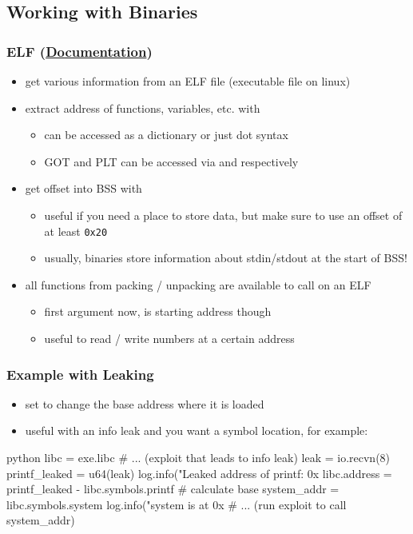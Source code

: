 \documentclass[aspectratio=169]{beamer}
\newcommand{\hex}[1]{\texttt{0x#1}}
\newcommand{\docl}[1]{(\textbf{\href{#1}{Documentation}})}
\begin{document}
{\subsection{Working with Binaries}
\begin{frame}[fragile]
    \frametitle{ELF \docl{http://docs.pwntools.com/en/stable/elf/elf.html\#module-pwnlib.elf.elf}}
    \begin{itemize}
        \item get various information from an ELF file (executable file on linux)
        \item extract address of functions, variables, etc. with 
        \begin{itemize}
            \item can be accessed as a dictionary or just dot syntax 
            \item GOT and PLT can be accessed via  and  respectively
        \end{itemize}
        \item get offset into BSS with 
        \begin{itemize}
            \item useful if you need a place to store data, but make sure to use an offset of at least \hex{20}
            \item usually, binaries store information about stdin/stdout at the start of BSS!
        \end{itemize}
        \item all functions from packing / unpacking are available to call on an ELF
        \begin{itemize}
            \item first argument now, is starting address though
            \item useful to read / write numbers at a certain address
        \end{itemize}
    \end{itemize}

\end{frame}
\begin{frame}[fragile]
    \frametitle{Example with Leaking}
    \begin{itemize}
        \item set  to change the base address where it is loaded
        \item useful with an info leak and you want a symbol location, for example:
    \end{itemize}
    \begin{codebox}{python}
libc = exe.libc
# ... (exploit that leads to info leak)
leak = io.recvn(8)
printf_leaked = u64(leak)
log.info("Leaked address of printf: 0x%
libc.address = printf_leaked - libc.symbols.printf # calculate base
system_addr = libc.symbols.system
log.info("system is at 0x%
# ... (run exploit to call system_addr)\end{codebox}
\end{frame}

}
\end{document}
